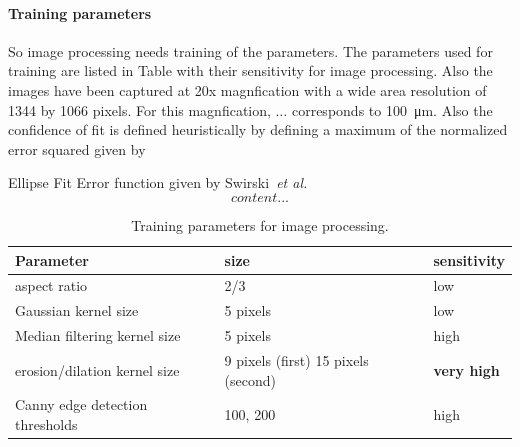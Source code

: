 \documentclass[12pt, twoside, a4paper]{article}
\begin{document}
\paragraph{Training parameters}
So image processing needs training of the parameters. The parameters used for training are listed in Table with their sensitivity for image processing. Also the images have been captured at 20x magnfication with a wide area resolution of 1344 by 1066 pixels. For this magnfication, $\ldots$ corresponds to \SI{100}{\micro\metre}. Also the confidence of fit is defined heuristically by defining a maximum of the normalized error squared given by

Ellipse Fit Error function given by Swirski~\emph{et al.}~\cite{Swirski2012}
\begin{equation}
	content...
\end{equation}
\begin{table}
	\centering
	\begin{tabular}{lll}
		\hline\hline
		Parameter						& size 		& sensitivity 	\\
		\hline
		aspect ratio					& 2/3		& low			\\
		Gaussian kernel size			& 5 pixels 	& low			\\
		Median filtering kernel size	& 5 pixels	& high			\\
		erosion/dilation kernel size	& 9 pixels (first) 15 pixels (second)	& \textbf{very high}			\\
		Canny edge detection thresholds	& 100, 200	& high			\\
		\hline\hline
	\end{tabular}
	\caption{Training parameters for image processing.}
	\label{table training parameters}
\end{table}
%
\end{document}
